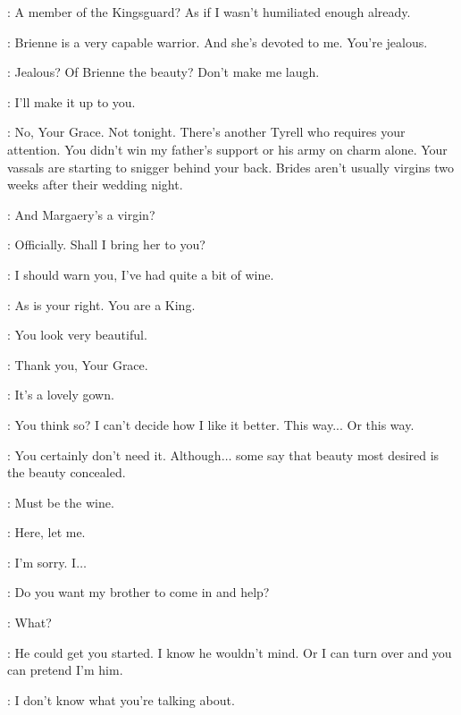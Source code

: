 \LORAS: A member of the Kingsguard? As if I wasn't humiliated enough already. 

\RENLY: Brienne is a very capable warrior. And she's devoted to me. You're jealous. 

\LORAS: Jealous? Of Brienne the beauty? Don't make me laugh. 

\RENLY: I'll make it up to you. 

\LORAS: No, Your Grace. Not tonight. There's another Tyrell who requires your attention. You didn't win my father's support or his army on charm alone. Your vassals are starting to snigger behind your back. Brides aren't usually virgins two weeks after their wedding night. 

\RENLY: And Margaery's a virgin? 

\LORAS: Officially. Shall I bring her to you? 


\RENLY: I should warn you, I've had quite a bit of wine. 

\MARGAERY: As is your right. You are a King. 

\RENLY: You look very beautiful. 

\MARGAERY: Thank you, Your Grace. 

\RENLY: It's a lovely gown. 

\MARGAERY: You think so? I can't decide how I like it better. This way...  Or this way.


\RENLY: You certainly don't need it. Although$\ldots$ some say that beauty most desired is the beauty concealed. 


\RENLY: Must be the wine. 

\MARGAERY: Here, let me. 


\RENLY: I'm sorry. I$\ldots$ 

\MARGAERY: Do you want my brother to come in and help? 

\RENLY: What? 

\MARGAERY: He could get you started. I know he wouldn't mind. Or I can turn over and you can pretend I'm him. 

\RENLY: I don't know what you're talking about. 

